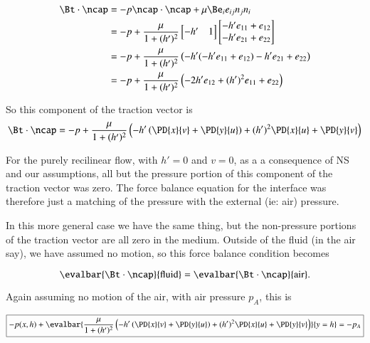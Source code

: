 \begin{align*}
\Bt \cdot \ncap 
&=
-p \ncap \cdot \ncap + \mu \Be_i e_{ij} n_j n_i \\
&=
-p
+
\frac{\mu}{1 + (h')^2}
\begin{bmatrix}
-h' & 1
\end{bmatrix}
\begin{bmatrix}
-h' e_{11} + e_{12} \\
-h' e_{21} + e_{22}
\end{bmatrix} \\
&=
-p
+
\frac{\mu}{1 + (h')^2}
\left(
-h'(-h' e_{11} + e_{12}) -h' e_{21} + e_{22}
\right)  \\
&=
-p
+
\frac{\mu}{1 + (h')^2}
\left(
-2 h' e_{12} 
+ (h')^2 e_{11} + e_{22}
\right)
\end{align*}

So this component of the traction vector is
\begin{equation}\label{eqn:inclinedFlowWithoutConstantHeightAssumption:240}
\Bt \cdot \ncap 
=
-p
+
\frac{\mu}{1 + (h')^2}
\left(
- h' 
\left( 
\PD{x}{v} +
\PD{y}{u}
\right)
+ (h')^2 \PD{x}{u} 
 + \PD{y}{v} 
\right)
\end{equation}

For the purely recilinear flow, with $h' = 0$ and $v = 0$, as a a consequence of NS and our assumptions, all but the pressure portion of this component of the traction vector was zero.  The force balance equation for the interface was therefore just a matching of the pressure with the external (ie: air) pressure.

In this more general case we have the same thing, but the non-pressure portions of the traction vector are all zero in the medium.  Outside of the fluid (in the air say), we have assumed no motion, so this force balance condition becomes

\begin{equation}\label{eqn:inclinedFlowWithoutConstantHeightAssumption:260}
\evalbar{\Bt \cdot \ncap}{\text{fluid}}
=
\evalbar{\Bt \cdot \ncap}{\text{air}}.
\end{equation}

Again assuming no motion of the air, with air pressure $p_A$, this is

\begin{equation}\label{eqn:inclinedFlowWithoutConstantHeightAssumption:280}
\boxed{
-p(x, h)
+
\evalbar{
\frac{\mu}{1 + (h')^2}
\left(
- h' 
\left( 
\PD{x}{v} +
\PD{y}{u}
\right)
+ (h')^2 \PD{x}{u} 
 + \PD{y}{v} 
\right)
}{y = h}
= -p_A
}
\end{equation}

